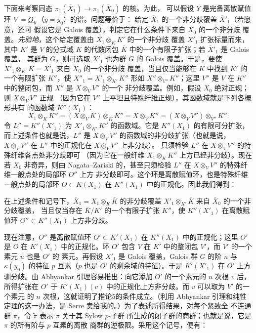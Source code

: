 下面来考察同态
$\pi_1(\overline X_1)\longrightarrow\pi_1(\overline X_0)$ 的核。为此，
可以假设 $Y$ 是完备离散赋值环 $V=\underline{O}_y$（$y=y_0$）的谱。问题等价于：
给定 $\overline X_1$ 的一个非分歧覆盖 $\overline X'_1$（若愿意，还可
假设它是 Galois 覆盖），判定它在什么条件下来自 $X_0$ 的一个非分歧
覆盖。\textit{先验地}，这个给定覆盖由 $X_1\otimes_KK'$ 的一个非分歧
覆盖 $X'_1$ 扩张标量而来，其中 $K'$ 是 $V$ 的分式域 $K$ 的代数闭包
$\overline K$ 中的一个有限子扩张；若 $\overline X'_1$ 是 Galois 覆盖，
其群为 $G$，则可选取 $X'_1$ 也为群 $G$ 的 Galois 覆盖。于是，要使
$X'_1\otimes_{K'}\overline K=\overline X'_1$ 来自 $X_0$ 的一个非分歧
覆盖，当且仅当能够在 $\overline K$ 中找到
$K'$ 的一个有限扩张 $K''$，使
$X''_1=X'_1\otimes_{K'}K''$ 形如 $X''\otimes_{V''}K''$；这里 $V''$
是 $V$ 在 $K''$ 中的整闭包，而 $X''$ 是 $X\otimes_VV''$ 的一个
非分歧覆盖。例如，假设 $X_0$ 绝对正规；则 $X\otimes_VV''$ 正规
（因为它在 $V''$ 上平坦且特殊纤维正规），其函数域就是下列各概形共有
的函数域 $K''(X_1)$：
\[
  X_1\otimes_KK''
  =(X\otimes_VK)\otimes_KK''
  =X\otimes_VK''
  =(X\otimes_VV'')\otimes_{V''}K''.
\]
令 $L''=K''(X'_1)$ 为 $X'_1\otimes_{K'}K''$ 的函数域。它是
$K''(X_1)$ 的有限可分扩张，而上述条件也就是说，$L''$ 是
$X\otimes_VV''$ 的函数域的非分歧扩张（也就是说，
$X\otimes_VV''$ 在 $L''$ 中的正规化在 $X\otimes_VV''$ 上非分歧）。
只须检验 $L''$ 在 $X\otimes_VV''$ 的特殊纤维各点处非分歧即可
（因为它在一般纤维 $X_1\otimes_KK''$ 上方已经非分歧）。现在若
$X_0$ 非奇异，则由 Nagata--Zariski 的，甚至只须检验
$L''$ 在 $X\otimes_VV''$ 的特殊纤维一般点处的局部环 $O''$ 上方
非分歧即可。这个环是离散赋值环，也是特殊纤维一般点处的局部环
$O\subset K(X_1)$ 在 $K''(X_1)$ 中的正规化。因此我们得到：

 在上述条件和记号下，$\overline X_1=
X_1\otimes_K\overline K$ 的非分歧覆盖
$X'_1\otimes_{K'}\overline K$ 来自 $\overline X_0$ 的一个非分歧覆盖，
当且仅当存在 $\overline K/K'$ 的一个有限子扩张 $K''$，使
$K''(X'_1)$ 在离散赋值环 $O''\subset K''(X_1)$ 上方非分歧。

现在注意，$O''$ 是离散赋值环 $O'\subset K'(X_1)$ 在 $K''(X_1)$
中的正规化；这里 $O'$ 是 $O$ 在 $K'(X_1)$ 中的正规化。环 $O'$ 包含
$V$ 在 $K'$ 中的整闭包 $V'$，而 $V'$ 的一个素元 $u$ 也是 $O'$ 的
素元。再假设 $X'_1$ 是 Galois 覆盖，Galois 群 $G$ 的阶 $n$ 与
$\kappa(y_0)$ 的特征 $p$ 互素（$p$ 也是 $O'$ 的剩余域的特征）。于是
$K'(X'_1)$ 在 $O'$ 上方驯分歧。由 Abhyankar 引理容易推出：向它添加
$O'$ 的一个素元的 $n$ 次根 $v$ 后，所得扩张在 $O'$ 于
$K'(X_1)(v)$ 中的正规化上方非分歧。而 $v$ 可以取为 $V'$ 的一个素元
的 $n$ 次根，这就证明了推论5的条件成立。（利用 Abhyankar 引理和纯性
定理的这一办法，是 Serre 卖给我的。）为了表述所得结果，对每个紧致全
不连通群 $\pi$，令 $\widetilde\pi$ 表示 $\pi$ 关于其 Sylow $p$-子群
所生成的闭子群的商群；也就是说，它是 $\pi$ 的所有阶与 $p$ 互素的离散
商群的逆极限。采用这个记号，便有：

